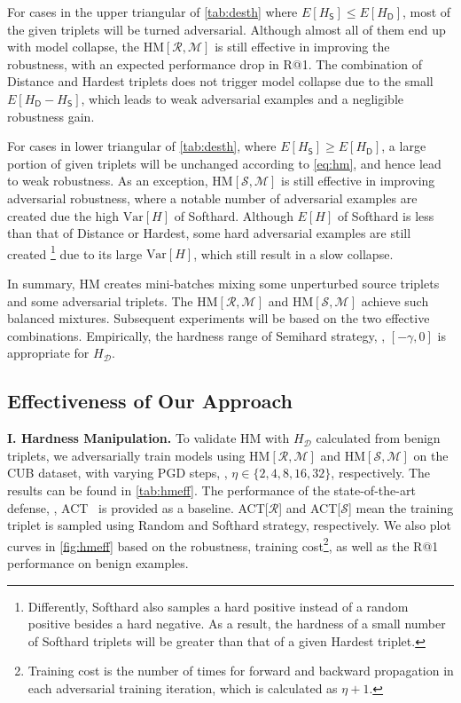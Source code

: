 \documentclass[10pt,twocolumn,letterpaper]{article}
\begin{document}

For cases in the upper triangular of \cref{tab:desth} where $E[H_\mathsf{S}]
\leqslant E[H_\mathsf{D}]$, most of the given triplets will be turned
adversarial.
%
Although almost all of them end up with model collapse, the
$\text{HM}[\mathcal{R},\mathcal{M}]$ is still effective in improving the
robustness, with an expected performance drop in R@1.
%
The combination of Distance and Hardest triplets does not trigger model
collapse due to the small $E[H_\mathsf{D}-H_\mathsf{S}]$, which leads to weak
adversarial examples and a negligible robustness gain.

For cases in lower triangular of \cref{tab:desth}, where $E[H_\mathsf{S}]
\geqslant E[H_\mathsf{D}]$, a large portion of given triplets will be unchanged
according to \cref{eq:hm}, and hence lead to weak robustness.
%
As an exception, $\text{HM}[\mathcal{S},\mathcal{M}]$ is still effective in
improving adversarial robustness, where a notable number of adversarial
examples are created due the high $\text{Var}[H]$ of Softhard.
%
Although $E[H]$ of Softhard is less than that of Distance or Hardest, some hard
adversarial examples are still created
%
\footnote{Differently, Softhard also samples a
hard positive instead of a random positive besides a hard negative.
%
As a result, the hardness of a small number of Softhard triplets will be 
greater than that of a given Hardest triplet.}
%
due to its large $\text{Var}[H]$, which
still result in a slow collapse.


In summary, HM creates mini-batches mixing some unperturbed source triplets and
some adversarial triplets.
%
The $\text{HM}[\mathcal{R}, \mathcal{M}]$ and $\text{HM}[\mathcal{S},
\mathcal{M}]$ achieve such balanced mixtures.
%
Subsequent experiments will be based on the two effective combinations.
%
Empirically, the hardness range of Semihard strategy,
\ie, $[-\gamma,0]$ is appropriate for $H_\mathcal{D}$.

\subsection{Effectiveness of Our Approach}
\label{sec:42}



\noindent\textbf{I. Hardness Manipulation.}
%
To validate HM with $H_\mathcal{D}$ calculated from benign
triplets, we adversarially train models using $\text{HM}[\mathcal{R},
\mathcal{M}]$ and $\text{HM}[\mathcal{S}, \mathcal{M}]$ on the CUB dataset,
with varying PGD steps, \ie, $\eta\in\{2,4,8,16,32\}$, respectively.
%
The results can be found in \cref{tab:hmeff}.
%
The performance of the state-of-the-art defense, \ie, ACT~\cite{robrank} is
provided as a baseline.
%
ACT[$\mathcal{R}$] and ACT[$\mathcal{S}$] mean the training triplet is sampled
using Random and Softhard strategy, respectively.
%
We also plot curves in \cref{fig:hmeff} based on the robustness, training
cost\footnote{Training cost is the number of times for forward and backward
propagation in each adversarial training iteration, which is calculated as
$\eta+1$.}, as well as the R@1 performance on benign examples.
\end{document}
